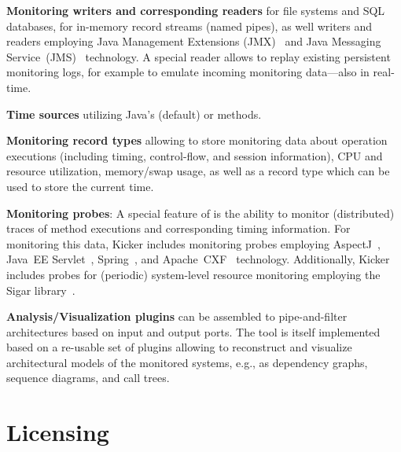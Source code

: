 \begin{compactitem}
 \item \textbf{Monitoring writers and corresponding readers} for %
file systems and SQL databases, %
for in-memory record streams (named pipes), %
as well writers and readers employing Java Management %
Extensions (JMX)~\cite{JMX-Website} and %
Java Messaging Service~(JMS)~\cite{JMS-WebSite} technology. %
A special reader allows to replay existing persistent %
monitoring logs, for example to emulate incoming monitoring %
data---also in real-time.
 \item \textbf{Time sources} utilizing Java's  (default) %
or  methods.
 \item \textbf{Monitoring record types} allowing to store %
monitoring data about operation executions (including timing, control-flow, %
and session information), CPU and resource utilization, memory/swap usage, as well as %
a record type which can be used to store the current time.
\item \textbf{Monitoring probes}: A special feature of \Kicker{} is the ability to monitor (distributed) %
traces of method executions and corresponding timing information. %
For monitoring this data, Kicker includes monitoring probes employing %
AspectJ~\cite{AspectJ-WebSite}, %
Java~EE Servlet~\cite{JavaServletTechnology-WebSite}, %
Spring~\cite{Spring-WebSite}, and %
Apache~CXF~\cite{CXF-WebSite} technology. %
Additionally, Kicker includes probes for (periodic) system-level resource %
monitoring employing the Sigar library~\cite{HypericSigarWebsite}.
\item \textbf{Analysis/Visualization plugins} can be assembled to %
pipe-and-filter architectures based on input and output ports. The %
\KickerTraceAnalysis{} tool 
is itself implemented based on a re-usable set of \KickerAnalysisPart{} %
plugins allowing to reconstruct and visualize architectural models of the %
monitored systems, e.g., as dependency graphs, sequence diagrams, and call %
trees. %
\end{compactitem}




\section{Licensing}

